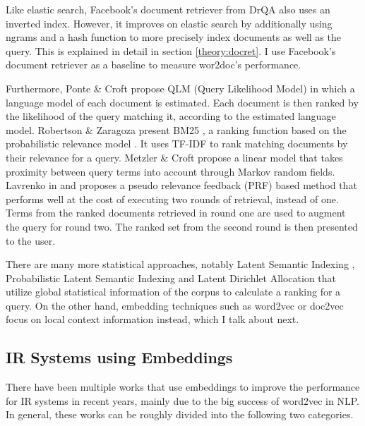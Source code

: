 Like elastic search, Facebook's document retriever from DrQA \citep{drqa} also uses an inverted index. However, it improves on elastic
search by additionally using ngrams and a hash function to more precisely index documents as well as the query. This is explained in
detail in section \ref{theory:docret}. I use Facebook's document retriever as a baseline to measure wor2doc's performance.

Furthermore, Ponte \& Croft propose QLM (Query Likelihood Model) \citep{qlm} in which a language model of each document is estimated.
Each document is then ranked by the likelihood of the query matching it, according to the estimated language model. Robertson \&
Zaragoza present BM25 \citep{bm25}, a ranking function based on the probabilistic relevance model \citep{prob-relevance-model}. It uses
TF-IDF to rank matching documents by their relevance for a query. Metzler \& Croft propose a linear model \citep{metzler2005} that
takes proximity between query terms into account through Markov random fields. Lavrenko in \citet{lavrenko2001} and
\citet{lavrenko2004} proposes a pseudo relevance feedback (PRF) based method that performs well at the cost of executing two rounds of
retrieval, instead of one. Terms from the ranked documents retrieved in round one are used to augment the query for round two. The
ranked set from the second round is then presented to the user.

There are many more statistical approaches, notably Latent Semantic Indexing \citep{lsi}, Probabilistic Latent Semantic Indexing
\citep{plsi} and Latent Dirichlet Allocation \citep{lda} that utilize global statistical information of the corpus to calculate a
ranking for a query. On the other hand, embedding techniques such as word2vec \citep{word2vec} or doc2vec \citep{doc2vec} focus
on local context information instead, which I talk about next.


\subsection{IR Systems using Embeddings}

There have been multiple works that use embeddings to improve the performance for IR systems in recent years, mainly due to the
big success of word2vec \citep{word2vec} in NLP. In general, these works can be roughly divided into the following two categories.

